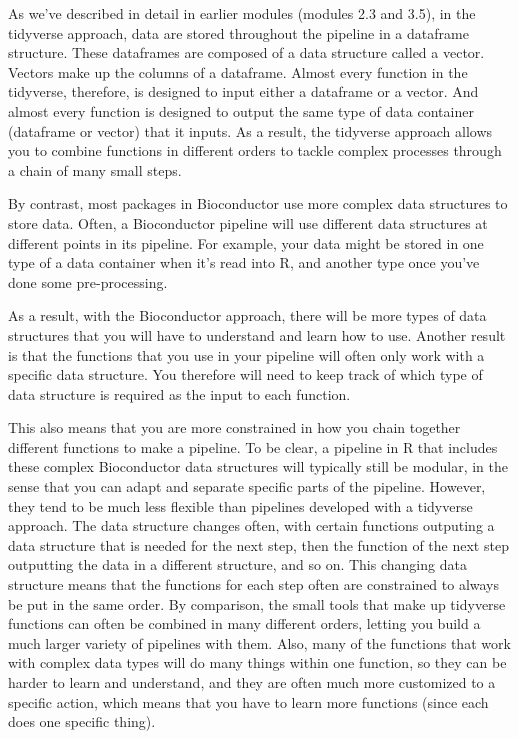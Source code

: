 \documentclass[]{tufte-book}
\begin{document}
As we've described in detail in earlier modules (modules 2.3 and 3.5), in the
tidyverse approach, data are stored throughout the pipeline in a dataframe
structure. These dataframes are composed of a data structure called a vector.
Vectors make up the columns of a dataframe. Almost every function in the
tidyverse, therefore, is designed to input either a dataframe or a vector. And
almost every function is designed to output the same type of data container
(dataframe or vector) that it inputs. As a result, the tidyverse approach allows
you to combine functions in different orders to tackle complex processes through
a chain of many small steps.

By contrast, most packages in Bioconductor use more complex data structures
to store data. Often, a Bioconductor pipeline will use different data
structures at different points in its pipeline. For example, your data might
be stored in one type of a data container when it's read into R, and
another type once you've done some pre-processing.

As a result, with the Bioconductor approach, there will be more types of data
structures that you will have to understand and learn how to use. Another result
is that the functions that you use in your pipeline will often only work with a
specific data structure. You therefore will need to keep track of which type of
data structure is required as the input to each function.

This also means that you are more constrained in how you chain together
different functions to make a pipeline. To be clear, a pipeline in R that
includes these complex Bioconductor data structures will typically still be
modular, in the sense that you can adapt and separate specific parts of the
pipeline. However, they tend to be much less flexible than pipelines developed
with a tidyverse approach. The data structure changes often, with certain
functions outputing a data structure that is needed for the next step, then the
function of the next step outputting the data in a different structure, and so
on. This changing data structure means that the functions for each step often
are constrained to always be put in the same order. By comparison, the small
tools that make up tidyverse functions can often be combined in many different
orders, letting you build a much larger variety of pipelines with them. Also,
many of the functions that work with complex data types will do many things
within one function, so they can be harder to learn and understand, and they are
often much more customized to a specific action, which means that you have to
learn more functions (since each does one specific thing).
\end{document}
